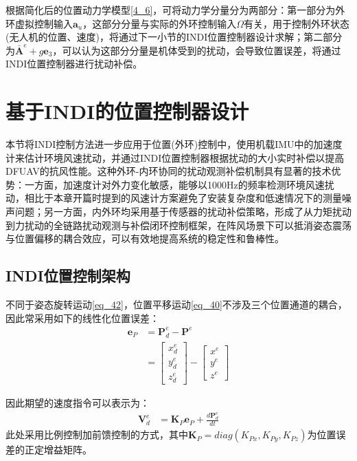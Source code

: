 根据简化后的位置动力学模型\eqref{4_6}，可将动力学分量分为两部分：第一部分为外环虚拟控制输入$\boldsymbol{a}_u$，这部分分量与实际的外环控制输入$\Omega$有关，用于控制外环状态(无人机的位置、速度)，将通过下一小节的INDI位置控制器设计求解；第二部分为$\bar{\boldsymbol{A}}^e+g\boldsymbol{e}_3$，可以认为这部分分量是机体受到的扰动，会导致位置误差，将通过INDI位置控制器进行扰动补偿。

\section{基于INDI的位置控制器设计}

本节将INDI控制方法进一步应用于位置(外环)控制中，使用机载IMU中的加速度计来估计环境风速扰动，并通过INDI位置控制器根据扰动的大小实时补偿以提高DFUAV的抗风性能。这种外环-内环协同的扰动观测补偿机制具有显著的技术优势：一方面，加速度计对外力变化敏感，能够以1000Hz的频率检测环境风速扰动，相比于本章开篇时提到的风速计方案避免了安装复杂度和低速情况下的测量噪声问题；另一方面，内外环均采用基于传感器的扰动补偿策略，形成了从力矩扰动到力扰动的全链路扰动观测与补偿闭环控制框架，在阵风场景下可以抵消姿态震荡与位置偏移的耦合效应，可以有效地提高系统的稳定性和鲁棒性。

\subsection{INDI位置控制架构}

不同于姿态旋转运动\eqref{eq_42}，位置平移运动\eqref{eq_40}不涉及三个位置通道的耦合，因此常采用如下的线性化位置误差：
\begin{equation}
    \begin{aligned}
        \boldsymbol{e}_P&=\boldsymbol{P}^e_d-\boldsymbol{P}^e\\
        &=\begin{bmatrix}x_d^e \\y_d^e \\z_d^e\end{bmatrix}-\begin{bmatrix}x^e \\y^e \\z^e\end{bmatrix}
    \end{aligned}
    \label{4_7}
\end{equation}

因此期望的速度指令可以表示为：
\begin{equation}
    \begin{aligned}
        \boldsymbol{V}_d^e&=\boldsymbol{K}_P\boldsymbol{e}_P+\frac{d\boldsymbol{P}^e_d}{dt}
    \end{aligned}
    \label{4_8}
\end{equation}
此处采用比例控制加前馈控制的方式，其中$\boldsymbol{K}_P=diag({K}_{Px},{K}_{Py},{K}_{Pz})$为位置误差的正定增益矩阵。

